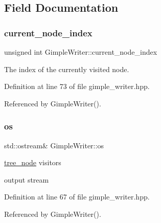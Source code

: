\subsection{Field Documentation}
\mbox{\label{structGimpleWriter_af30b2794d82d4be967a6a011a57ac51b}} 
\subsubsection{\texorpdfstring{current\+\_\+node\+\_\+index}{current\_node\_index}}
{\footnotesize\ttfamily unsigned int Gimple\+Writer\+::current\+\_\+node\+\_\+index\hspace{0.3cm}{\ttfamily [private]}}



The index of the currently visited node. 



Definition at line 73 of file gimple\+\_\+writer.\+hpp.



Referenced by Gimple\+Writer().

\mbox{\label{structGimpleWriter_aeb1a127b1ff523fa56220aac5601816d}} 
\subsubsection{\texorpdfstring{os}{os}}
{\footnotesize\ttfamily std\+::ostream\& Gimple\+Writer\+::os\hspace{0.3cm}{\ttfamily [private]}}



\hyperlink{classtree__node}{tree\+\_\+node} visitors 

output stream 

Definition at line 67 of file gimple\+\_\+writer.\+hpp.



Referenced by Gimple\+Writer().

\mbox{\label{structGimpleWriter_afe093493822b7caeaf9cc5bc44d149e3}} 
